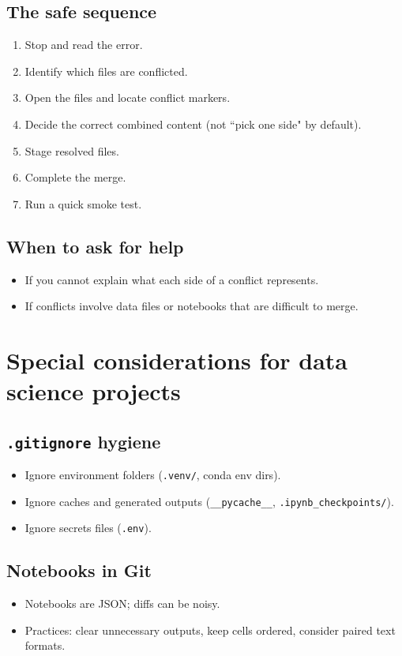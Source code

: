 \subsection{The safe sequence}
\begin{enumerate}
\item Stop and read the error.
\item Identify which files are conflicted.
\item Open the files and locate conflict markers.
\item Decide the correct combined content (not ``pick one side" by default).
\item Stage resolved files.
\item Complete the merge.
\item Run a quick smoke test.
\end{enumerate}

\subsection{When to ask for help}
\begin{itemize}
\item If you cannot explain what each side of a conflict represents.
\item If conflicts involve data files or notebooks that are difficult to merge.
\end{itemize}

\section{Special considerations for data science projects}
\subsection{\texttt{.gitignore} hygiene}
\begin{itemize}
\item Ignore environment folders (\texttt{.venv/}, conda env dirs).
\item Ignore caches and generated outputs (\texttt{\_\_pycache\_\_}, \texttt{.ipynb_checkpoints/}).
\item Ignore secrets files (\texttt{.env}).
\end{itemize}

\subsection{Notebooks in Git}
\begin{itemize}
\item Notebooks are JSON; diffs can be noisy.
\item Practices: clear unnecessary outputs, keep cells ordered, consider paired text formats.
\end{itemize}

